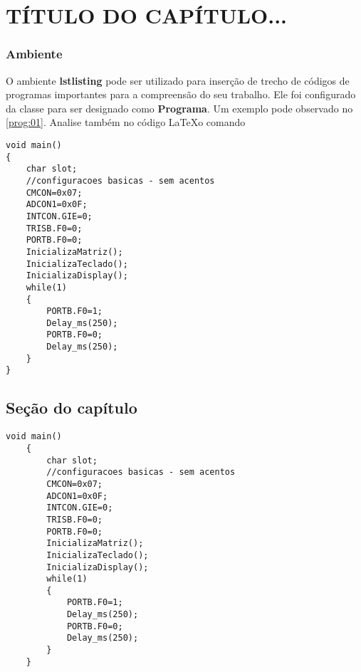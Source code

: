 \chapter{TÍTULO DO CAPÍTULO...}{}
\label{cap:03}

\lipsum

\subsection{Ambiente}

O ambiente \textbf{lstlisting} pode ser utilizado para inserção de trecho de códigos de programas importantes para a compreensão do seu trabalho. Ele foi configurado da classe \corujatex para ser designado como \textbf{Programa}. Um exemplo pode observado no \autoref{prog:01}. Analise também no código \LaTeX o comando 

\begin{lstlisting}[caption= Código teste em Linguagem C, label=prog:01] 
void main() 
{
	char slot;
	//configuracoes basicas - sem acentos
	CMCON=0x07;
	ADCON1=0x0F;
	INTCON.GIE=0;
	TRISB.F0=0;
	PORTB.F0=0;
	InicializaMatriz();
	InicializaTeclado();
	InicializaDisplay();
	while(1)
	{
		PORTB.F0=1;
		Delay_ms(250);
		PORTB.F0=0;
		Delay_ms(250);
	}
}	
\end{lstlisting}

\section{Seção do capítulo}
\lipsum %

\begin{lstlisting}[caption= Código teste do MikroC for PIC] 
	void main() 
	{
		char slot;
		//configuracoes basicas - sem acentos
		CMCON=0x07;
		ADCON1=0x0F;
		INTCON.GIE=0;
		TRISB.F0=0;
		PORTB.F0=0;
		InicializaMatriz();
		InicializaTeclado();
		InicializaDisplay();
		while(1)
		{
			PORTB.F0=1;
			Delay_ms(250);
			PORTB.F0=0;
			Delay_ms(250);
		}
	}	
\end{lstlisting}
